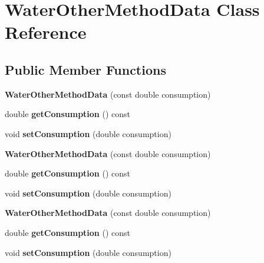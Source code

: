 \hypertarget{class_water_other_method_data}{}\section{Water\+Other\+Method\+Data Class Reference}
\label{class_water_other_method_data}
\subsection*{Public Member Functions}
\begin{DoxyCompactItemize}
\item 
\mbox{\label{class_water_other_method_data_a3594ee7b9785449a9bac2e1e34d17fe0}} 
{\bfseries Water\+Other\+Method\+Data} (const double consumption)
\item 
\mbox{\label{class_water_other_method_data_af1b7b78431e743af93febe3d538d765b}} 
double {\bfseries get\+Consumption} () const
\item 
\mbox{\label{class_water_other_method_data_a445d46bb8b4895ec6c9f8146707874ec}} 
void {\bfseries set\+Consumption} (double consumption)
\item 
\mbox{\label{class_water_other_method_data_a3594ee7b9785449a9bac2e1e34d17fe0}} 
{\bfseries Water\+Other\+Method\+Data} (const double consumption)
\item 
\mbox{\label{class_water_other_method_data_af1b7b78431e743af93febe3d538d765b}} 
double {\bfseries get\+Consumption} () const
\item 
\mbox{\label{class_water_other_method_data_a445d46bb8b4895ec6c9f8146707874ec}} 
void {\bfseries set\+Consumption} (double consumption)
\item 
\mbox{\label{class_water_other_method_data_a3594ee7b9785449a9bac2e1e34d17fe0}} 
{\bfseries Water\+Other\+Method\+Data} (const double consumption)
\item 
\mbox{\label{class_water_other_method_data_af1b7b78431e743af93febe3d538d765b}} 
double {\bfseries get\+Consumption} () const
\item 
\mbox{\label{class_water_other_method_data_a445d46bb8b4895ec6c9f8146707874ec}} 
void {\bfseries set\+Consumption} (double consumption)
\end{DoxyCompactItemize}



